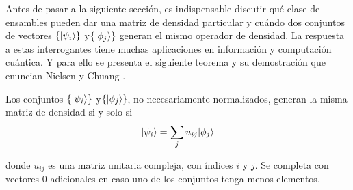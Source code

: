 Antes de pasar a la siguiente sección, es indispensable discutir qué clase de ensambles pueden dar una matriz de densidad particular y cuándo dos conjuntos de vectores $\{|\psi_i\rangle\}$ y$ \{|\phi_j\rangle \}$ generan el mismo operador de densidad. La respuesta a estas interrogantes tiene muchas aplicaciones en información y computación cuántica. Y para ello se presenta el siguiente teorema y su demostración que enuncian Nielsen y Chuang {\cite{nielsen_chuang_2010}}.




\begin{theorem}
Los conjuntos $\{|\psi_i\rangle\}$ y$ \{|\phi_j\rangle \}$, no necesariamente normalizados, generan la misma matriz de densidad si y solo si
\begin{equation}\label{teorema2.4}
|\psi_i\rangle= \sum_{j}u_{ij}|\phi_j\rangle
\end{equation}

donde $u_{ij}$ es una matriz unitaria compleja, con índices $i$ y $j$. Se completa con vectores 0 adicionales en caso uno de los conjuntos tenga menos elementos.
\end{theorem}

